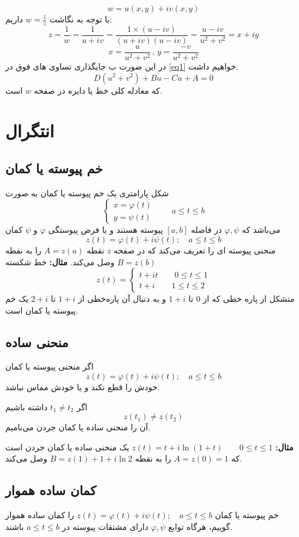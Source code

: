 \documentclass[12pt]{report}
\begin{document}
	 $$w = u(x, y) + iv(x, y)$$
	 با توجه به نگاشت 
	 $w = \frac{1}{z}$
	 داریم:
	 $$z = \frac{1}{w} = \frac{1}{u + iv}=\frac{1 \times (u - iv)}{(u+iv)(u - iv)} = \frac{u - iv}{u^2+v^2} = x +iy$$
	 $$x = \frac{u}{u^2 + v^2}\,,\, y = \frac{-v}{u^2 + v^2}$$
	 در این صورت ب جایگذاری تساوی های فوق در 
	 \ref{eq1}
	 خواهیم داشت.
	 $$D(u^2 + v^2) + Bu -Cu + A = 0$$
	 که معادله کلی خط یا دایره در صفحه 
	 $w$
	 است.
	 \chapter{انتگرال}
	 \section{خم پیوسته یا کمان}
	 شکل پارامتری یک خم پیوسته یا کمان به صورت 
	 \[
	 \begin{cases}
	 	x = \varphi(t) \\
	 	y = \psi(t) 
	 \end{cases}
 \qquad a \leq t \leq b
	 \]
	 می‌باشد که 
	 $\varphi , \psi$
	 در فاصله 
	 $[a, b]$
	 پیوسته هستند و با فرض پیوستگی 
	 $\varphi$
	 و
	 $\psi$
	 کمان
	 $$z(t) = \varphi(t) + i\psi(t); \quad a \leq t \leq b$$
	 منحنی پیوسته ای را تعریف می‌کند که در صفحه 
	 $z$
	 نقطه 
	 $A = z(a)$
	 را به نقطه
	 $B = z(b)$
	 وصل می‌کند.
	 \textbf{مثال:}
	 خط شکسته‌
	 \[
	 z(t) = 
	 \begin{cases}
	 	t + it \qquad 0\leq t\leq 1 \\
	 	t + i \qquad 1\leq t \leq 2
	 \end{cases}
	 \]
	 متشکل از پاره خطی که از 
	 $0$
	 تا 
	 $1 + i$
	 و به دنبال آن پاره‌خطی از 
	 $1+i$
	 تا
	 $2 + i$
	 یک خم پیوسته یا کمان است.
	 \section{منحنی ساده}
	 اگر منحنی پیوسته یا کمان
	 $$z(t) = \varphi(t)+ i\psi(t);\quad a \leq t \leq b$$
	 خودش را قطع نکند و یا خودش مماس نباشد.
	 
	 اگر 
	 $t_1 \neq t_2$
	 داشته باشیم
	 $$z(t_1) \neq z(t_2)$$
	 آن را منحنی ساده یا کمان جردن می‌نامیم.
	 
	 \textbf{مثال:}
	 $z(t) = t + i\ln(1 + t) \qquad 0\leq t \leq 1$
	 یک منحنی ساده یا کمان جردن است که 
	 $A = z(0) = 1$
	 را به نقطه
	 $B = z(1) + 1 + i\ln 2 $
	 وصل می‌کند.
	 \section{کمان ساده هموار}
	 خم پیوسته یا کمان 
	 $z(t) = \varphi(t) + i\psi(t); \quad a \leq t \leq b$
	 را کمان ساده هموار گوییم، هرگاه توابع 
	 $\varphi, \psi$
	 دارای مشتقات پیوسته در 
	 $a \leq t \leq b$
	 باشند.
	 
\end{document}
